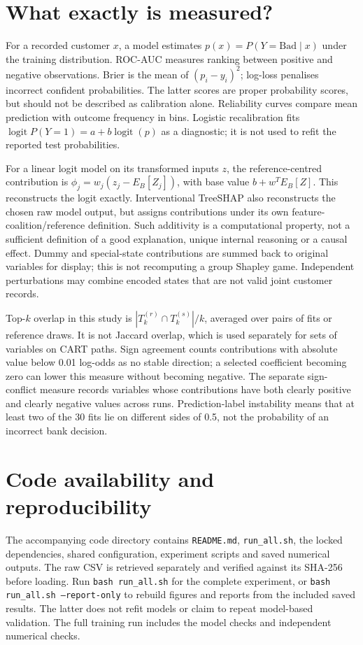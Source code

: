 \section{What exactly is measured?}

For a recorded customer $x$, a model estimates $p(x)=P(Y=\mathrm{Bad}\mid x)$ under the training distribution. ROC-AUC measures ranking between positive and negative observations. Brier is the mean of $(p_i-y_i)^2$; log-loss penalises incorrect confident probabilities. The latter scores are proper probability scores, but should not be described as calibration alone. Reliability curves compare mean prediction with outcome frequency in bins. Logistic recalibration fits $\operatorname{logit}P(Y=1)=a+b\operatorname{logit}(p)$ as a diagnostic; it is not used to refit the reported test probabilities.

For a linear logit model on its transformed inputs $z$, the reference-centred contribution is $\phi_j=w_j(z_j-E_B[Z_j])$, with base value $b+w^T E_B[Z]$. This reconstructs the logit exactly. Interventional TreeSHAP also reconstructs the chosen raw model output, but assigns contributions under its own feature-coalition/reference definition. Such additivity is a computational property, not a sufficient definition of a good explanation, unique internal reasoning or a causal effect. Dummy and special-state contributions are summed back to original variables for display; this is not recomputing a group Shapley game. Independent perturbations may combine encoded states that are not valid joint customer records.

Top-$k$ overlap in this study is $|T_k^{(r)}\cap T_k^{(s)}|/k$, averaged over pairs of fits or reference draws. It is not Jaccard overlap, which is used separately for sets of variables on CART paths. Sign agreement counts contributions with absolute value below 0.01 log-odds as no stable direction; a selected coefficient becoming zero can lower this measure without becoming negative. The separate sign-conflict measure records variables whose contributions have both clearly positive and clearly negative values across runs. Prediction-label instability means that at least two of the 30 fits lie on different sides of 0.5, not the probability of an incorrect bank decision.

\section{Code availability and reproducibility}
The accompanying code directory contains \texttt{README.md}, \texttt{run\_all.sh}, the locked dependencies, shared configuration, experiment scripts and saved numerical outputs. The raw CSV is retrieved separately and verified against its SHA-256 before loading. Run \texttt{bash run\_all.sh} for the complete experiment, or \texttt{bash run\_all.sh --report-only} to rebuild figures and reports from the included saved results. The latter does not refit models or claim to repeat model-based validation. The full training run includes the model checks and independent numerical checks.

